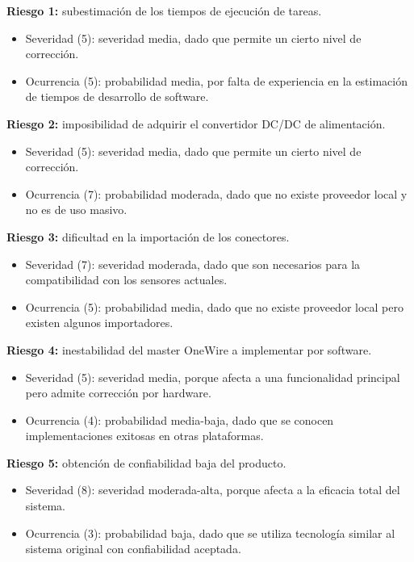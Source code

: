 \documentclass[
11pt, %
codirector, %
]{charter}
\begin{document}
\textbf{Riesgo 1:} subestimación de los tiempos de ejecución de tareas.
		\begin{itemize}
			\item Severidad (5): severidad media, dado que permite un cierto nivel de corrección.
			\item Ocurrencia (5): probabilidad media, por falta de experiencia en la estimación de tiempos de desarrollo de software. 
		\end{itemize}
\textbf{Riesgo 2:} imposibilidad de adquirir el convertidor DC/DC de alimentación.
		\begin{itemize}
			\item Severidad (5): severidad media, dado que permite un cierto nivel de corrección.
			\item Ocurrencia (7): probabilidad moderada, dado que no existe proveedor local y no 	es de uso masivo. 
		\end{itemize} 
\textbf{Riesgo 3:} dificultad en la importación de los conectores.
		\begin{itemize}
			\item Severidad (7): severidad moderada, dado que son necesarios para la 				compatibilidad con los sensores actuales.
			\item Ocurrencia (5): probabilidad media, dado que no existe proveedor local pero 		existen algunos importadores. 
		\end{itemize} 
\textbf{Riesgo 4:} inestabilidad del master OneWire a implementar por software.
		\begin{itemize}
			\item Severidad (5): severidad media, porque afecta a una funcionalidad principal pero admite corrección por hardware.
			\item Ocurrencia (4): probabilidad media-baja, dado que se conocen implementaciones exitosas en otras plataformas. 
		\end{itemize}   
\textbf{Riesgo 5:} obtención de confiabilidad baja del producto.
		\begin{itemize}
			\item Severidad (8): severidad moderada-alta, porque afecta a la eficacia total del sistema.
			\item Ocurrencia (3): probabilidad baja, dado que se utiliza tecnología similar al sistema original con confiabilidad aceptada. 
		\end{itemize}   
\end{document}
